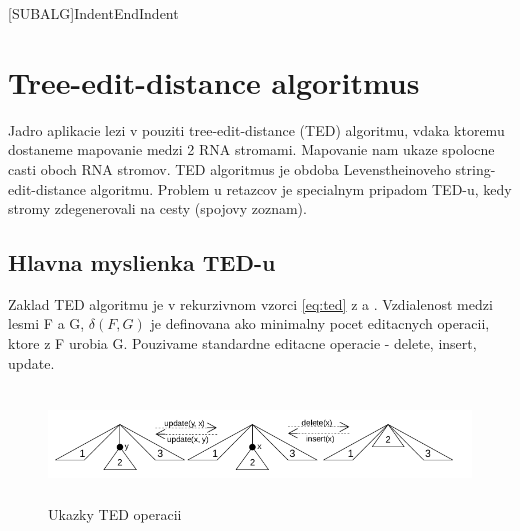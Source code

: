 \newcommand{\Cdel}{\ensuremath{c_{del}}}
\newcommand{\Cins}{\ensuremath{c_{ins}}}
\newcommand{\Cupd}{\ensuremath{c_{upd}}}

\newcommand{\AfullDecomposition}{\ensuremath{\mathcal{A}}}
\newcommand{\FrelevantSubforests}{\ensuremath{\mathcal{F}}}
\newcommand{\pluseq}{\stackrel{+}{=}}
\newcommand{\AlgCase}{$\left\{\rule{0pt}{\baselineskip}\right.$\parbox{\textwidth}}

\newcommand{\rtedCostSum}[3]{\sum_{{#1}' \in #1 - \gamma^{#2}(#1)}cena({#1}', #3)}


[SUBALG]{Indent}{EndIndent}{}{\algorithmicend\ }


\chapter{Tree-edit-distance algoritmus}

Jadro aplikacie lezi v pouziti tree-edit-distance (TED) algoritmu,
vdaka ktoremu dostaneme mapovanie medzi 2 RNA stromami. Mapovanie nam ukaze
spolocne casti oboch RNA stromov. TED algoritmus je obdoba Levenstheinoveho
string-edit-distance algoritmu. Problem u retazcov je specialnym pripadom
TED-u, kedy stromy zdegenerovali na cesty (spojovy zoznam).

\section{Hlavna myslienka TED-u}

Zaklad TED algoritmu je v rekurzivnom vzorci \ref{eq:ted} z \citet{DMRW} a \citet{RTED}. Vzdialenost medzi
lesmi F a G, $\delta(F, G)$ je definovana ako minimalny pocet editacnych operacii,
ktore z F urobia G. Pouzivame standardne editacne operacie - delete, insert, update.

\begin{figure}[H]
\centering
\includegraphics[width=140mm, height=30mm]{../img/TED_operations.png}
\caption{Ukazky TED operacii}
\label{obr:TED_operations}
\end{figure}

